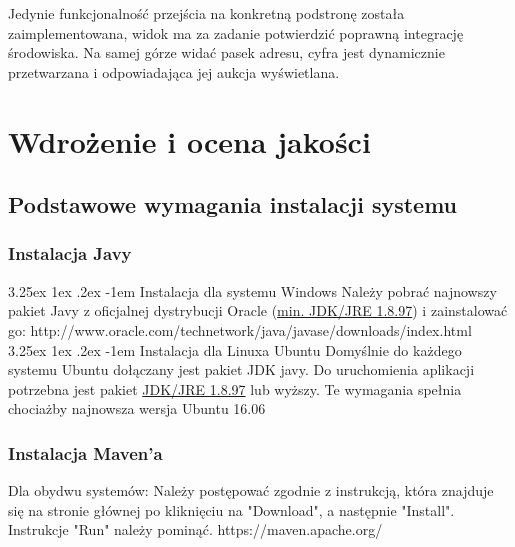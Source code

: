 \documentclass[10pt,titlepage]{article} %
\makeatletter
\renewcommand{\normalsize}{\fontsize{8pt}{10pt}\selectfont} %
\renewcommand\paragraph{\@startsection{paragraph}{5}{\z@}%
  {3.25ex \@plus1ex \@minus.2ex}%
  {-1em}%
  {\normalfont\normalsize\bfseries}}
\makeatother
\begin{document}
Jedynie funkcjonalność przejścia na konkretną podstronę została zaimplementowana, widok ma za zadanie potwierdzić poprawną integrację środowiska. Na samej górze widać pasek adresu, cyfra jest dynamicznie przetwarzana i odpowiadająca jej aukcja wyświetlana.

\newpage
\section{Wdrożenie i ocena jakości}
\subsection{Podstawowe wymagania instalacji systemu}\label{Podstawowe wymagania instalacji systemu}
\subsubsection{Instalacja Javy}
\paragraph{Instalacja dla systemu Windows}
Należy pobrać najnowszy pakiet Javy z oficjalnej dystrybucji Oracle (\underline{min. JDK/JRE 1.8.97}) i zainstalować go:
http://www.oracle.com/technetwork/java/javase/downloads/index.html
\paragraph{Instalacja dla Linuxa Ubuntu}
Domyślnie do każdego systemu Ubuntu dołączany jest pakiet JDK javy. Do uruchomienia aplikacji potrzebna jest pakiet \underline{JDK/JRE 1.8.97} lub wyższy.
Te wymagania spełnia chociażby najnowsza wersja Ubuntu 16.06


\subsubsection{Instalacja Maven'a}
Dla obydwu systemów:
Należy postępować zgodnie z instrukcją, która znajduje się na stronie głównej po kliknięciu na "Download", a następnie "Install". Instrukcje "Run" należy pominąć.
https://maven.apache.org/

\end{document}

